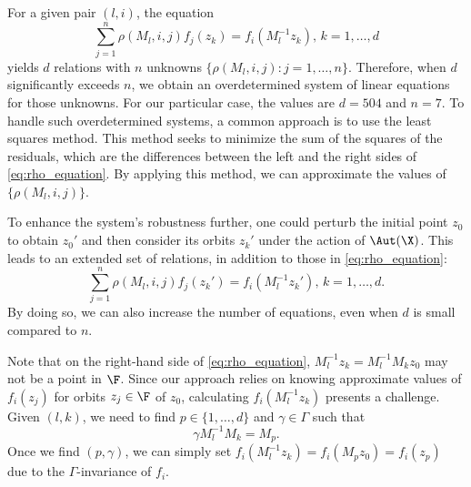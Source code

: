 For a given pair $(l,i)$, the equation
\begin{equation}
\sum_{j=1}^n \rho(M_l,i,j)f_j(z_k) = f_i(M_l^{-1}z_k), \, k=1,\dots, d
\label{eq:rho_equation}
\end{equation}
yields $d$ relations with $n$ unknowns $\{\rho(M_l,i,j) : j=1, \dots, n\}$.
Therefore, when $d$ significantly exceeds $n$, we obtain an overdetermined system of linear equations for 
those unknowns.
For our particular case, the values are $d=504$ and $n=7$.
To handle such overdetermined systems, a common approach is to use the least squares method.
This method seeks to minimize the sum of the squares of the residuals, which are the differences between the left and the right sides of \eqref{eq:rho_equation}.
By applying this method, we can approximate the values of $\{\rho(M_l,i,j)\}$.

To enhance the system's robustness further, one could perturb the initial point $z_0$ to obtain $z_0'$ and then consider its orbits $z_k'$ under the action of $\Aut(\X)$. 
This leads to an extended set of relations, in addition to those in \eqref{eq:rho_equation}:
\[
\sum_{j=1}^n \rho(M_l,i,j)f_j(z_k') = f_i(M_l^{-1}z_k'), \, k=1,\dots, d.
\]
By doing so, we can also increase the number of equations, even when $d$ is small compared to $n$.

Note that on the right-hand side of \eqref{eq:rho_equation}, $M_l^{-1}z_k=M_l^{-1}M_k z_0$ may not be a point in $\F$.
Since our approach relies on knowing approximate values of $f_i(z_j)$ for orbits $z_j\in \F$ of $z_0$, calculating $f_i(M_l^{-1}z_k)$ presents a challenge.
Given $(l, k)$, we need to find $p\in \{1,\dots, d\}$ and $\gamma\in \Gamma$ such that
\begin{equation}
\gamma M_l^{-1}M_k = M_p.
\label{eq:findp}
\end{equation}
Once we find $(p,\gamma)$, we can simply set $f_i(M_l^{-1}z_k)=f_i(M_p z_0) = f_i(z_p)$ due to the $\Gamma$-invariance of $f_i$.

